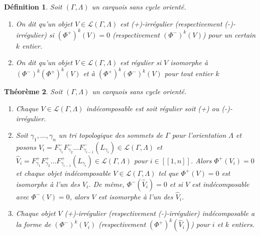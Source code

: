 \documentclass[a4paper,11pt]{article}
\newtheorem{thm}{Théorème}[section]
\newtheorem{defi}[thm]{Définition}%
\begin{document}
\begin{defi}
  Soit $(\Gamma,\Lambda)$ un carquois sans cycle orienté. 
  \begin{enumerate}
  \item On dit qu'un objet $V \in \mathscr L(\Gamma,\Lambda)$ est \emph{(+)-irrégulier} (respectivement \emph{(-)-irrégulier}) si $(\Phi^{+})^{k}(V) = 0$ (respectivement $(\Phi^{-})^{k}(V)$) pour un certain $k$ entier.
  \item On dit qu'un objet $V \in \mathscr L(\Gamma,\Lambda)$ est \emph{régulier} si $V$ isomorphe à $(\Phi^{-})^{k}(\Phi^{+})^{k}(V)$ et à $(\Phi^{+})^{k}(\Phi^{-})^{k}(V)$ pour tout entier $k$
  \end{enumerate}
\end{defi}
\begin{thm}
\label{thm3}
  Soit $(\Gamma,\Lambda)$ un carquois sans cycle orienté.
  \begin{enumerate}
  \item Chaque $V \in \mathscr L(\Gamma,\Lambda)$ indécomposable est soit régulier soit (+) ou (-)-irrégulier.
  \item Soit $\gamma_{1},\dots,\gamma_{n}$ un tri topologique des sommets de $\Gamma$ pour l'orientation $\Lambda$ et posons $V_{i} = F^{-}_{\gamma_{1}}F^{-}_{\gamma_{2}} \dots F^{-}_{\gamma_{i-1}}(L_{\gamma_{i}}) \in \mathscr L(\Gamma,\Lambda)$ et  $\widehat V_{i} = F^{+}_{\gamma_{1}}F^{+}_{\gamma_{2}} \dots F^{+}_{\gamma_{i-1}}(L_{\gamma_{i}}) \in \mathscr L(\Gamma,\Lambda)$ pour $i \in [\![1,n]\!]$. Alors $\Phi^{+}(V_{i})=0$ et chaque objet indécomposable $V \in \mathscr L(\Gamma,\Lambda)$ tel que $\Phi^{+}(V) =0$ est isomorphe à l'un des $V_{i}$. De même, $\Phi^{-}(\widehat V_{i}) = 0$ et si $V$ est indécomposable avec $\Phi^{-}(V) = 0$, alors $V$ est isomorphe à l'un des $\widehat V_{i}$.
\item  Chaque objet $V$ (+)-irrégulier (respectivement (-)-irrégulier) indécomposable a la forme de $(\Phi^{-})^{k}(V_{i})$ (respectivement $(\Phi^{+})^{k}(\widehat V_{i})$) pour $i$ et $k$ entiers.
  \end{enumerate}
\end{thm}
\end{document}

